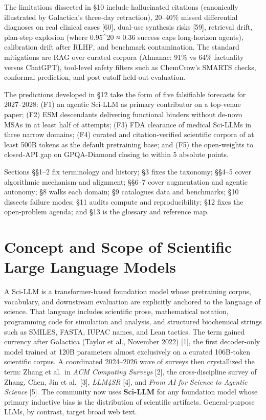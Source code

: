 The limitations dissected in §10 include hallucinated citations (canonically illustrated by Galactica's three-day retraction), 20--40\% missed differential diagnoses on real clinical cases {[}60{]}, dual-use synthesis risks {[}59{]}, retrieval drift, plan-step explosion (where 0.95\^{}20 ≈ 0.36 success caps long-horizon agents), calibration drift after RLHF, and benchmark contamination. The standard mitigations are RAG over curated corpora (Almanac: 91\% vs 64\% factuality versus ChatGPT), tool-level safety filters such as ChemCrow's SMARTS checks, conformal prediction, and post-cutoff held-out evaluation.

The predictions developed in §12 take the form of five falsifiable forecasts for 2027--2028: (F1) an agentic Sci-LLM as primary contributor on a top-venue paper; (F2) ESM descendants delivering functional binders without de-novo MSAs in at least half of attempts; (F3) FDA clearance of medical Sci-LLMs in three narrow domains; (F4) curated and citation-verified scientific corpora of at least 500B tokens as the default pretraining base; and (F5) the open-weights to closed-API gap on GPQA-Diamond closing to within 5 absolute points.

Sections §§1--2 fix terminology and history; §3 fixes the taxonomy; §§4--5 cover algorithmic mechanism and alignment; §§6--7 cover augmentation and agentic autonomy; §8 walks each domain; §9 catalogues data and benchmarks; §10 dissects failure modes; §11 audits compute and reproducibility; §12 fixes the open-problem agenda; and §13 is the glossary and reference map.

\section{Concept and Scope of Scientific Large Language Models}\label{concept-and-scope-of-scientific-large-language-models}

A Sci-LLM is a transformer-based foundation model whose pretraining corpus, vocabulary, and downstream evaluation are explicitly anchored to the language of science. That language includes scientific prose, mathematical notation, programming code for simulation and analysis, and structured biochemical strings such as SMILES, FASTA, IUPAC names, and Lean tactics. The term gained currency after Galactica (Taylor et al., November 2022) {[}1{]}, the first decoder-only model trained at 120B parameters almost exclusively on a curated 106B-token scientific corpus. A coordinated 2024--2026 wave of surveys then crystallized the term: Zhang et al.~in \emph{ACM Computing Surveys} {[}2{]}, the cross-discipline survey of Zhang, Chen, Jin et al.~{[}3{]}, \emph{LLM4SR} {[}4{]}, and \emph{From AI for Science to Agentic Science} {[}5{]}. The community now uses \textbf{Sci-LLM} for any foundation model whose primary inductive bias is the distribution of scientific artifacts. General-purpose LLMs, by contrast, target broad web text.

